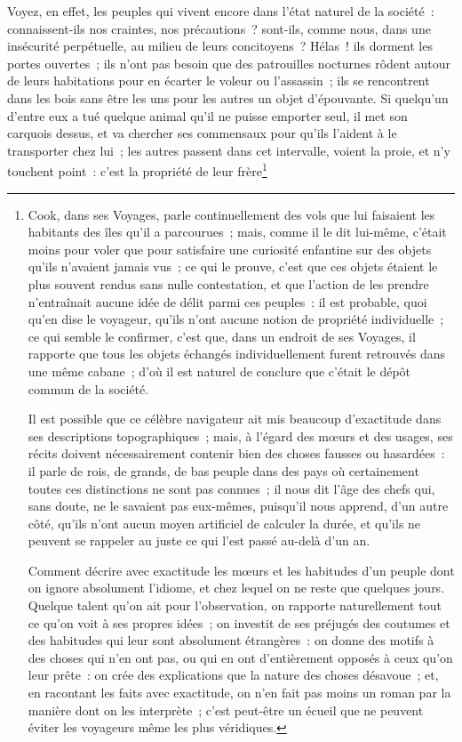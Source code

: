 \documentclass[french,twoside]{book} %
\begin{document}
Voyez, en effet, les peuples qui vivent encore dans l’état naturel de la société : connaissent-ils nos craintes, nos précautions ? sont-ils, comme nous, dans une insécurité perpétuelle, au milieu de leurs concitoyens ? Hélas ! ils dorment les portes ouvertes ; ils n’ont pas besoin que des patrouilles nocturnes rôdent autour de leurs habitations pour en écarter le voleur ou l’assassin ; ils se rencontrent dans les bois sans être les uns pour les autres un objet d’épouvante. Si quelqu’un d’entre eux a tué quelque animal qu’il ne puisse emporter seul, il met son carquois dessus, et va chercher ses commensaux pour qu’ils l’aident à le transporter chez lui ; les autres passent dans cet intervalle, voient la proie, et n’y touchent point : c’est la propriété de leur frère\footnote{\noindent Cook, dans ses Voyages, parle continuellement des vols que lui faisaient les habitants des îles qu’il a parcourues ; mais, comme il le dit lui-même, c’était moins pour voler que pour satisfaire une curiosité enfantine sur des objets qu’ils n’avaient jamais vus ; ce qui le prouve, c’est que ces objets étaient le plus souvent rendus sans nulle contestation, et que l’action de les prendre n’entraînait aucune idée de délit parmi ces peuples : il est probable, quoi qu’en dise le voyageur, qu’ils n’ont aucune notion de propriété individuelle ; ce qui semble le confirmer, c’est que, dans un endroit de ses Voyages, il rapporte que tous les objets échangés individuellement furent retrouvés dans une même cabane ; d’où il est naturel de conclure que c’était le dépôt commun de la société.\par
Il est possible que ce célèbre navigateur ait mis beaucoup d’exactitude dans ses descriptions topographiques ; mais, à l’égard des mœurs et des usages, ses récits doivent nécessairement contenir bien des choses fausses ou hasardées : il parle de rois, de grands, de bas peuple dans des pays où certainement toutes ces distinctions ne sont pas connues ; il nous dit l’âge des chefs qui, sans doute, ne le savaient pas eux-mêmes, puisqu’il nous apprend, d’un autre côté, qu’ils n’ont aucun moyen artificiel de calculer la durée, et qu’ils ne peuvent se rappeler au juste ce qui l’est passé au-delà d’un an.\par
Comment décrire avec exactitude les mœurs et les habitudes d’un peuple dont on ignore absolument l’idiome, et chez lequel on ne reste que quelques jours. Quelque talent qu’on ait pour l’observation, on rapporte naturellement tout ce qu’on voit à ses propres idées ; on investit de ses préjugés des coutumes et des habitudes qui leur sont absolument étrangères : on donne des motifs à des choses qui n’en ont pas, ou qui en ont d’entièrement opposés à ceux qu’on leur prête : on crée des explications que la nature des choses désavoue ; et, en racontant les faits avec exactitude, on n’en fait pas moins un roman par la manière dont on les interprète ; c’est peut-être un écueil que ne peuvent éviter les voyageurs même les plus véridiques.
}
\end{document}

